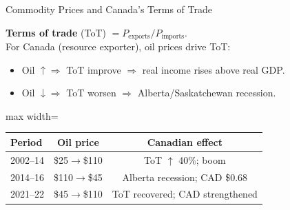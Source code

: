 \documentclass[aspectratio=169]{beamer}
\begin{document}
\begin{frame}{Commodity Prices and Canada's Terms of Trade}

\textbf{Terms of trade} (ToT) $= P_{\text{exports}}/P_{\text{imports}}$.\\[0.3em]
For Canada (resource exporter), oil prices drive ToT:
\begin{itemize}\small
  \item Oil $\uparrow \Rightarrow$ ToT improve $\Rightarrow$ real income rises above real GDP.
  \item Oil $\downarrow \Rightarrow$ ToT worsen $\Rightarrow$ Alberta/Saskatchewan recession.
\end{itemize}
\vspace{0.3em}
\begin{adjustbox}{max width=\columnwidth}
\begin{tabular}{lcc}
\toprule
Period & Oil price & Canadian effect\\
\midrule
2002--14 & \$25$\to$\$110 & ToT $\uparrow$ 40\%; boom\\
2014--16 & \$110$\to$\$45 & Alberta recession; CAD \$0.68\\
2021--22 & \$45$\to$\$110 & ToT recovered; CAD strengthened\\
\bottomrule
\end{tabular}
\end{adjustbox}

\end{frame}
\end{document}
